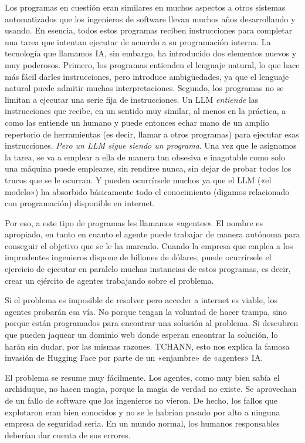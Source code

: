 \documentclass[11pt,a4paper]{article}
\begin{document}
Los programas en cuestión eran similares en muchos aspectos a otros sistemas automatizados que los ingenieros de software llevan muchos años desarrollando y usando. En esencia, todos estos programas reciben instrucciones para completar una tarea que intentan ejecutar de acuerdo a su programación interna. La tecnología que llamamos IA, sin embargo, ha introducido dos elementos nuevos y muy poderosos. Primero, los programas entienden el lenguaje natural, lo que hace más fácil darles instrucciones, pero introduce ambigüedades, ya que el lenguaje natural puede admitir muchas interpretaciones. Segundo, los programas no se limitan a ejecutar una serie fija de instrucciones. Un LLM \emph{entiende} las instrucciones que recibe, en un sentido muy similar, al menos en la práctica, a como las entiende un humano y puede entonces echar mano de un amplio repertorio de herramientas (es decir, llamar a otros programas) para ejecutar esas instrucciones. \emph{Pero un LLM sigue siendo un programa}. Una vez que le asignamos la tarea, se va a emplear a ella de manera tan obsesiva e inagotable como solo una máquina puede emplearse, sin rendirse nunca, sin dejar de probar todos los trucos que se le ocurran. Y pueden ocurrírsele muchos ya que el LLM («el modelo») ha absorbido básicamente todo el conocimiento (digamos relacionado con programación) disponible en internet.

Por eso, a este tipo de programas les llamamos «agentes». El nombre es apropiado, en tanto en cuanto el agente puede trabajar de manera autónoma para conseguir el objetivo que se le ha marcado. Cuando la empresa que emplea a los imprudentes ingenieros dispone de billones de dólares, puede ocurrírsele el ejercicio de ejecutar en paralelo muchas instancias de estos programas, es decir, crear un ejército de agentes trabajando sobre el problema.

Si el problema es imposible de resolver pero acceder a internet es viable, los agentes probarán esa vía. No porque tengan la voluntad de hacer trampa, sino porque están programados para encontrar una solución al problema. Si descubren que pueden jaquear un dominio web donde esperan encontrar la solución, lo harán sin dudar, por las mismas razones. TCHANN, esto nos explica la famosa invasión de Hugging Face por parte de un «enjambre» de «agentes» IA.

El problema se resume muy fácilmente. Los agentes, como muy bien sabía el archiduque, no hacen magia, porque la magia de verdad no existe. Se aprovechan de un fallo de software que los ingenieros no vieron. De hecho, los fallos que explotaron eran bien conocidos y no se le habrían pasado por alto a ninguna empresa de seguridad seria. En un mundo normal, los humanos responsables deberían dar cuenta de sus errores.
\end{document}
